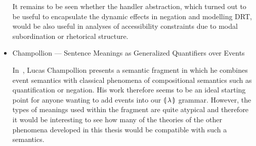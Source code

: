 \begin{itemize}
\begin{itemize}
    \begin{exe}
       \label{ex:salmon}
    \end{exe}
  \end{itemize}

  It remains to be seen whether the handler abstraction, which turned out
  to be useful to encapsulate the dynamic effects in negation and modelling
  DRT, would be also useful in analyses of accessibility constraints due to
  modal subordination or rhetorical structure.


\item Champollion --- Sentence Meanings as Generalized Quantifiers over Events

  In~\cite{champollion2015interaction}, Lucas Champollion presents a
  semantic fragment in which he combines event semantics with classical
  phenomena of compositional semantics such as quantification or
  negation. His work therefore seems to be an ideal starting point for
  anyone wanting to add events into our ${\llparenthesis \, \lambda \, \rrparenthesis}$ grammar. However, the types
  of meanings used within the fragment are quite atypical and therefore it
  would be interesting to see how many of the theories of the other
  phenomena developed in this thesis would be compatible with such a
  semantics.
  
\end{itemize}
